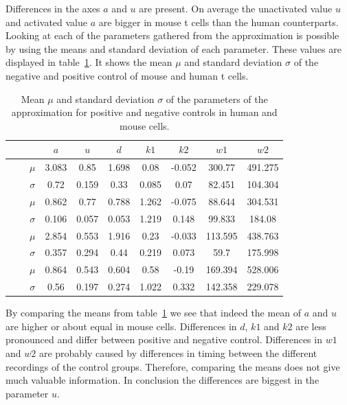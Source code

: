 Differences in the axes $a$ and $u$ are present. On average the unactivated value $u$ and activated value $a$ are bigger in mouse t cells than the human counterparts. Looking at each of the parameters gathered from the approximation is possible by using the means and standard deviation of each parameter. These values are displayed in table~\ref{tab:mean_std_parameters}. It shows the mean $\mu$ and standard deviation $\sigma$ of the negative and positive control of mouse and human t cells.

\begin{table}[h!]
	\centering
	\begin{tabular}{|c|c|c|c|c|c|c|c|c|c|}
		\hline
		& & & $a$ & $u$ & $d$ & $k1$ & $k2$ & $w1$ & $w2$\\
		\hline
		\multirow{4}{*}{\rotatebox[origin=c]{90}{mouse}} & \multirow{2}{*}{\rotatebox[origin=c]{90}{pos}} & $\mu$ & 3.083 & 0.85 & 1.698 & 0.08 & -0.052 & 300.77 & 491.275\\
		\cline{3-10}
		& & $\sigma$ & 0.72 & 0.159 & 0.33 & 0.085 & 0.07 & 82.451 & 104.304\\
		\cline{2-10}
		& \multirow{2}{*}{\rotatebox[origin=c]{90}{neg}} & $\mu$ & 0.862 & 0.77 & 0.788 & 1.262 & -0.075 & 88.644 & 304.531\\
		\cline{3-10}
		& & $\sigma$ & 0.106 & 0.057 & 0.053 & 1.219 & 0.148 & 99.833 & 184.08\\
		\hline
		\multirow{4}{*}{\rotatebox[origin=c]{90}{human}} & \multirow{2}{*}{\rotatebox[origin=c]{90}{pos}} & $\mu$ & 2.854 & 0.553 &  1.916 & 0.23 & -0.033 & 113.595 & 438.763\\
		\cline{3-10}
		& & $\sigma$ & 0.357 & 0.294 & 0.44 & 0.219 & 0.073 & 59.7 & 175.998\\
		\cline{2-10}
		& \multirow{2}{*}{\rotatebox[origin=c]{90}{neg}} & $\mu$ & 0.864 & 0.543 & 0.604 & 0.58 & -0.19 & 169.394 & 528.006 \\
		\cline{3-10}
		& & $\sigma$ & 0.56 & 0.197 & 0.274 & 1.022 & 0.332 & 142.358 & 229.078 \\
		\hline
	\end{tabular}
	\caption{Mean $\mu$ and standard deviation $\sigma$ of the parameters of the approximation for positive and negative controls in human and mouse cells.}
	\label{tab:mean_std_parameters}
\end{table}

By comparing the means from table~\ref{tab:mean_std_parameters} we see that indeed the mean of $a$ and $u$ are higher or about equal in mouse cells. Differences in $d$, $k1$ and $k2$ are less pronounced and differ between positive and negative control. Differences in $w1$ and $w2$ are probably caused by differences in timing between the different recordings of the control groups. Therefore, comparing the means does not give much valuable information. In conclusion the differences are biggest in the parameter $u$.

